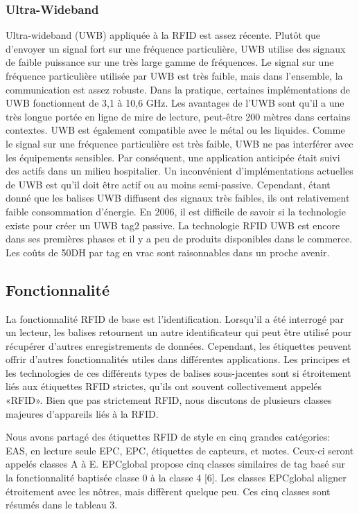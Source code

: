 \documentclass[11pt, a4paper, twoside]{book}
\begin{document}
\subsubsection{Ultra-Wideband}
Ultra-wideband (UWB) appliquée à la RFID est assez récente. Plutôt que d'envoyer un signal fort sur une fréquence particulière, UWB utilise des signaux de faible puissance sur une très large gamme de fréquences. Le signal sur une fréquence particulière utilisée par UWB est très faible, mais dans l'ensemble, la communication est assez robuste. Dans la pratique, certaines implémentations de UWB fonctionnent de 3,1 à 10,6 GHz.
Les avantages de l'UWB sont qu'il a une très longue portée en ligne de mire de lecture, peut-être 200 mètres dans certains contextes. UWB est également compatible avec le métal ou les liquides. Comme le signal sur une fréquence particulière est très faible, UWB ne pas interférer avec les équipements sensibles. Par conséquent, une application anticipée était suivi des actifs dans un milieu hospitalier.
Un inconvénient d'implémentations actuelles de UWB est qu'il doit être actif ou au moins semi-passive. Cependant, étant donné que les balises UWB diffusent des signaux très faibles, ils ont relativement faible consommation d'énergie. En 2006, il est difficile de savoir si la technologie existe pour créer un UWB tag2 passive.
La technologie RFID UWB est encore dans ses premières phases et il y a peu de produits disponibles dans le commerce. Les coûts de 50DH par tag en vrac sont raisonnables dans un proche avenir.
\subsection{Fonctionnalité}
La fonctionnalité RFID de base est l'identification. Lorsqu'il a été interrogé par un lecteur, les balises retournent un autre identificateur qui peut être utilisé pour récupérer d'autres enregistrements de données. Cependant, les étiquettes peuvent offrir d'autres fonctionnalités utiles dans différentes applications. Les principes et les technologies de ces différents types de balises sous-jacentes sont si étroitement liés aux étiquettes RFID strictes, qu'ils ont souvent collectivement appelés «RFID». Bien que pas strictement RFID, nous discutons de plusieurs classes majeures d'appareils liés à la RFID.

Nous avons partagé des étiquettes RFID de style en cinq grandes catégories: EAS, en lecture seule EPC, EPC, étiquettes de capteurs, et motes. Ceux-ci seront appelés classes A à E. EPCglobal propose cinq classes similaires de tag basé sur la fonctionnalité baptisée classe 0 à la classe 4 [6]. Les classes EPCglobal aligner étroitement avec les nôtres, mais diffèrent quelque peu. Ces cinq classes sont résumés dans le tableau 3.\\
\end{document}
